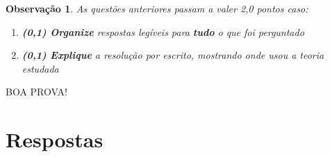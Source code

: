 \documentclass[12pt,a4paper]{article}
\newtheorem*{note}{Observação}
\begin{document}
\medskip
\begin{note}
As questões anteriores passam a valer 2,0 pontos caso:
\begin{enumerate}
\item \textbf{(0,1) Organize} respostas legíveis para \textbf{tudo} o que foi perguntado
\item \textbf{(0,1) Explique} a resolução por escrito, mostrando onde usou a teoria estudada
\end{enumerate}
\end{note}

\begin{center}
BOA PROVA!
\end{center}

\newpage
\restoregeometry
\section*{Respostas}
\shipoutAnswer
\end{document}
